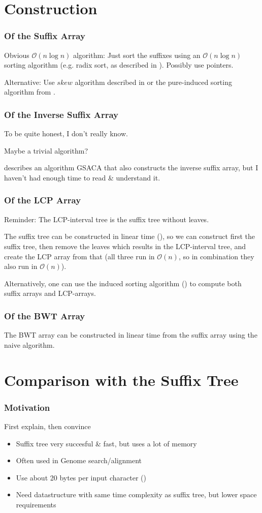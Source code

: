 \documentclass[compress,handout]{beamer} %
\renewcommand{\O}{\mathcal{O}}
\begin{document}
\section{Construction}

\begin{frame}
	\frametitle{Of the Suffix Array} Obvious $\O(n \log n)$
	algorithm: Just sort the suffixes using an $\O(n \log
	n)$ sorting algorithm (e.g. radix sort, as described in
	\cite{manber1993suffix}). Possibly use pointers.

	Alternative: Use $skew$ algorithm described in
	\cite{karkkainen2003simple} or the pure-induced sorting
	algorithm from \cite{nong2009linear}.
\end{frame}

\begin{frame}
	\frametitle{Of the Inverse Suffix Array}
	To be quite honest, I don't really know.

	Maybe a trivial algorithm?

	\cite{baier2015linear} describes an algorithm GSACA that also
	constructs the inverse suffix array, but I haven't had enough
	time to read \& understand it.
\end{frame}

\begin{frame}
	\frametitle{Of the LCP Array}
	Reminder: The LCP-interval tree is the suffix tree without leaves.

	The suffix tree can be constructed in linear time
	(\cite{giegerich1997ukkonen}), so we can construct first
	the suffix tree, then remove the leaves which results in the
	LCP-interval tree, and create the LCP array from that (all three
	run in $\O(n)$, so in combination they also run in $\O(n)$).

	Alternatively, one can use the induced sorting algorithm
	(\cite{fischer2011inducing}) to compute both suffix arrays
	and LCP-arrays.
\end{frame}

\begin{frame}
	\frametitle{Of the BWT Array}
	The BWT array can be constructed in linear time from the suffix
	array using the naive algorithm.
\end{frame}

\section{Comparison with the Suffix Tree}

\begin{frame}
	\frametitle{Motivation}
	First explain, then convince

	\begin{itemize}
		\item Suffix tree very succesful \& fast, but uses a lot of memory
		\item Often used in Genome search/alignment
		\item Use about 20 bytes per input character (\cite{kurtz1999reducing})
		\item Need datastructure with same time complexity as suffix tree, but lower space requirements
	\end{itemize}
\end{frame}
\end{document}
